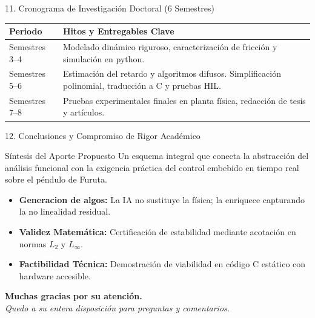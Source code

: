 \documentclass[10pt,aspectratio=169]{beamer}
\begin{document}
\begin{frame}{11. Cronograma de Investigación Doctoral (6 Semestres)}
  \begin{table}
    \centering
    \small
    \begin{tabular}{lp{8.5cm}}
      \toprule
      \textbf{Periodo} & \textbf{Hitos y Entregables Clave} \\
      \midrule
      Semestres 3--4 & Modelado dinámico riguroso, caracterización de fricción y simulación en python. \\
      Semestres 5--6 &  Estimación del retardo y algoritmos difusos. Simplificación polinomial, traducción a C y pruebas HIL. \\
      Semestres 7--8 & Pruebas experimentales finales en planta física, redacción de tesis y artículos. \\
      \bottomrule
    \end{tabular}
  \end{table}
\end{frame}

\begin{frame}{12. Conclusiones y Compromiso de Rigor Académico}
  \begin{block}{Síntesis del Aporte Propuesto}
    Un esquema integral que conecta la abstracción del análisis funcional con la exigencia práctica del control embebido en tiempo real sobre el péndulo de Furuta.
  \end{block}

  \vspace{0.2cm}
  \begin{itemize}
    \item \textbf{Generacion de algos:} La IA no sustituye la física; la enriquece capturando la no linealidad residual.
    \item \textbf{Validez Matemática:} Certificación de estabilidad mediante acotación en normas $L_2$ y $L_\infty$.
    \item \textbf{Factibilidad Técnica:} Demostración de viabilidad en código C estático con hardware accesible.
  \end{itemize}

  \vspace{0.4cm}
  \begin{center}
    \Large \textbf{Muchas gracias por su atención.} \\
    \small \textit{Quedo a su entera disposición para preguntas y comentarios.}
  \end{center}
\end{frame}
\end{document}
